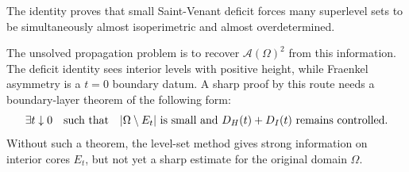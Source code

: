 \documentclass[11pt]{article}
\begin{document}
The identity proves that small Saint-Venant deficit forces many superlevel sets
to be simultaneously almost isoperimetric and almost overdetermined.

The unsolved propagation problem is to recover \(\mathcal A(\Omega)^2\) from
this information. The deficit identity sees interior levels with positive
height, while Fraenkel asymmetry is a \(t=0\) boundary datum. A sharp proof by
this route needs a boundary-layer theorem of the following form:
\[
\exists t\downarrow0
\quad\hbox{such that}\quad
|\Omega\setminus E_t|
\hbox{ is small and }
D_H(t)+D_I(t)
\hbox{ remains controlled.}
\]
Without such a theorem, the level-set method gives strong information on
interior cores \(E_t\), but not yet a sharp estimate for the original domain
\(\Omega\).
\end{document}
